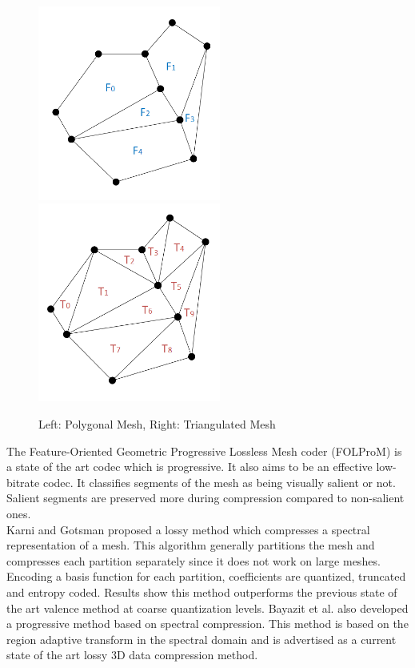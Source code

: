 \begin{figure}[!h]
\centering
\includegraphics[width=6cm]{images/ch2/PolygonMeshExample}
\includegraphics[width=6cm]{images/ch2/TriangleMeshExample}
\caption{Left: Polygonal Mesh, Right: Triangulated Mesh}
\label{MeshExamples}
\end{figure}


The Feature-Oriented Geometric Progressive Lossless Mesh coder (FOLProM) \cite{Peng10Feature} is a state of the art codec which is progressive. It also aims to be an effective low-bitrate codec. It classifies segments of the mesh as being visually salient or not. Salient segments are preserved more during compression compared to non-salient ones. \\

Karni and Gotsman \cite{Karni00Spectral} proposed a lossy method which compresses a spectral representation of a mesh. This algorithm generally partitions the mesh and compresses each partition separately since it does not work on large meshes. Encoding a basis function for each partition, coefficients are quantized, truncated and entropy coded. Results show this method outperforms the previous state of the art valence method \cite{touma98triangle} at coarse quantization levels. Bayazit et al. \cite{Bayazit103DMesh} also developed a progressive method based on spectral compression. This method is based on the region adaptive transform in the spectral domain and is advertised as a current state of the art lossy 3D data compression method. \\

